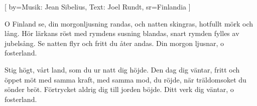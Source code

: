 

[
by={Musik: Jean Sibelius, Text: Joel Rundt},
sr={Finlandia}
]

\beginverse*
O Finland se, din morgonljusning randas,
och natten skingras, hotfullt mörk och lång.
Hör lärkans röst med rymdens susning blandas,
snart rymden fylles av jubelsång.
Se natten flyr och fritt du åter andas.
Din morgon ljusnar, o fosterland.
\endverse

\beginverse* Stig högt, vårt land, som du ur natt dig höjde.
Den dag dig väntar, fritt och öppet möt
med samma kraft, med samma mod, du röjde,
när träldomsoket du sönder bröt.
Förtrycket aldrig dig till jorden böjde.
Ditt verk dig väntar, o fosterland.
\endverse
\endsong


